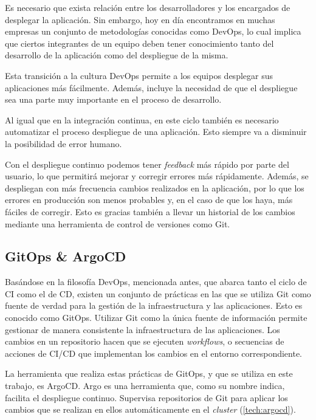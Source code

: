 Es necesario que exista relación entre los desarrolladores y los encargados de desplegar la aplicación. Sin embargo, hoy en día encontramos en muchas empresas un conjunto de metodologías conocidas como DevOps\cite{devops}, lo cual implica que ciertos integrantes de un equipo deben tener conocimiento tanto del desarrollo de la aplicación como del despliegue de la misma.

Esta transición a la cultura DevOps permite a los equipos desplegar sus aplicaciones más fácilmente. Además, incluye la necesidad de que el despliegue sea una parte muy importante en el proceso de desarrollo.

Al igual que en la integración continua, en este ciclo también es necesario automatizar el proceso despliegue de una aplicación. Esto siempre va a disminuir la posibilidad de error humano.

Con el despliegue continuo podemos tener \textit{feedback} más rápido por parte del usuario, lo que permitirá mejorar y corregir errores más rápidamente. Además, se despliegan con más frecuencia cambios realizados en la aplicación, por lo que los errores en producción son menos probables y, en el caso de que los haya, más fáciles de corregir. Esto es gracias también a llevar un historial de los cambios mediante una herramienta de control de versiones como Git.

\subsection*{GitOps \& ArgoCD}

Basándose en la filosofía DevOps, mencionada antes, que abarca tanto el ciclo de CI como el de CD, existen un conjunto de prácticas en las que se utiliza Git como fuente de verdad para la gestión de la infraestructura y las aplicaciones. Esto es conocido como GitOps\cite{gitops}. Utilizar Git como la única fuente de información permite gestionar de manera consistente la infraestructura de las aplicaciones. Los cambios en un repositorio hacen que se ejecuten \textit{workflows}, o secuencias de acciones de CI/CD que implementan los cambios en el entorno correspondiente.

La herramienta que realiza estas prácticas de GitOps, y que se utiliza en este trabajo, es ArgoCD\cite{argocd}. Argo es una herramienta que, como su nombre indica, facilita el despliegue continuo. Supervisa repositorios de Git para aplicar los cambios que se realizan en ellos automáticamente en el \textit{cluster} (\ref{tech:argocd}).

